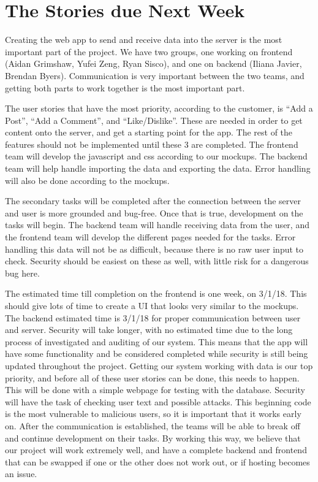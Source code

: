 \documentclass[12pt]{article}
\begin{document}
\section{The Stories due Next Week}

Creating the web app to send and receive data into the server is the most
important part of the project. We have two groups, one working on frontend
(Aidan Grimshaw, Yufei Zeng, Ryan Sisco), and one on backend (Iliana Javier,
Brendan Byers). Communication is very important between the two teams, and
getting both parts to work together is the most important part.

The user stories that have the most priority, according to the customer, is “Add
a Post”, “Add a Comment”, and  “Like/Dislike”. These are needed in order to get
content onto the server, and get a starting point for the app. The rest of the
features should not be implemented until these 3 are completed. The frontend
team will develop the javascript and css according to our mockups. The backend
team will help handle importing the data and exporting the data. Error handling
will also be done according to the mockups.

The secondary tasks will be completed after the connection between the server
and user is more grounded and bug-free. Once that is true, development on the
tasks will begin. The backend team will handle receiving data from the user, and
the frontend team will develop the different pages needed for the tasks. Error
handling this data will not be as difficult, because there is no raw user input
to check. Security should be easiest on these as well, with little risk for a
dangerous bug here.

The estimated time till completion on the frontend is one week, on 3/1/18. This
should give lots of time to create a UI that looks very similar to the mockups.
The backend estimated time is 3/1/18 for proper communication between user and
server. Security will take longer, with no estimated time due to the long
process of investigated and auditing of our system. This means that the app will
have some functionality and be considered completed while security is still
being updated throughout the project. Getting our system working with data is
our top priority, and before all of these user stories can be done, this needs
to happen. This will be done with a simple webpage for testing with the
database. Security will have the task of checking user text and possible
attacks. This beginning code is the most vulnerable to malicious users, so it is
important that it works early on. After the communication is established, the
teams will be able to break off and continue development on their tasks. By
working this way, we believe that our project will work extremely well, and have
a complete backend and frontend that can be swapped if one or the other does not
work out, or if hosting becomes an issue.
\end{document}
